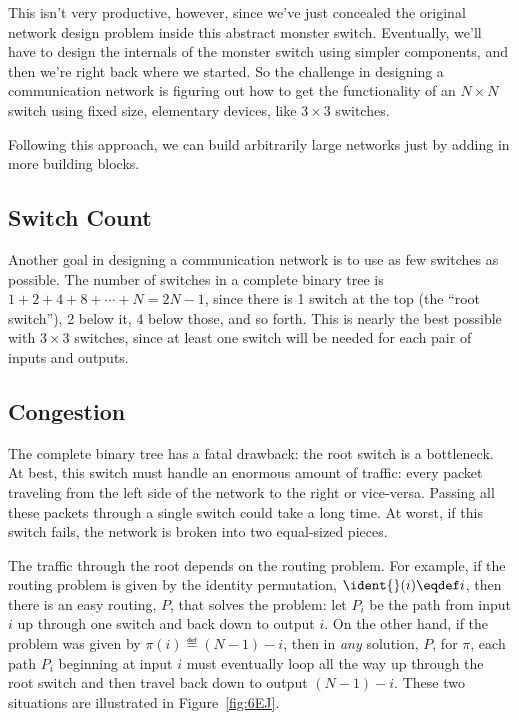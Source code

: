 This isn't very productive, however, since we've just concealed the
original network design problem inside this abstract monster switch.
Eventually, we'll have to design the internals of the monster switch
using simpler components, and then we're right back where we started.
So the challenge in designing a communication network is figuring out
how to get the functionality of an $N \times N$ switch using fixed
size, elementary devices, like $3 \times 3$ switches.
\begin{solution}
Following this approach, we can build arbitrarily large networks
just by adding in more building blocks. 
\end{solution}

\subsection{Switch Count}

Another goal in designing a communication network is to use as few
switches as possible.  The number of switches in a complete binary
tree is $1 + 2 + 4 + 8 + \cdots + N = 2N - 1$, since there is 1 switch
at the top (the ``root switch''), 2 below it, 4 below those, and so
forth.  This is nearly the best possible with $3 \times 3$ switches,
since at least one switch will be needed for each pair of inputs and
outputs.

\subsection{Congestion}

The complete binary tree has a fatal drawback: the root switch is a
bottleneck.  At best, this switch must handle an enormous amount of
traffic: every packet traveling from the left side of the network to the
right or vice-versa.  Passing all these packets through a single switch
could take a long time.  At worst, if this switch fails, the network is
broken into two equal-sized pieces.

The traffic through the root depends on the routing problem.  For
example, if the routing problem is given by the identity permutation,
 $\ident{}(i) \eqdef i$, then
there is an easy routing, $P$, that solves the problem: let $P_i$ be
the path from input $i$ up through one switch and back down to output
$i$.  On the other hand, if the problem was given by $\pi(i) \eqdef (N
- 1) - i$, then in \emph{any} solution, $P$, for $\pi$, each path
$P_i$ beginning at input $i$ must eventually loop all the way up
through the root switch and then travel back down to output $(N - 1) -
i$.  These two situations are illustrated in Figure~\ref{fig:6EJ}.

